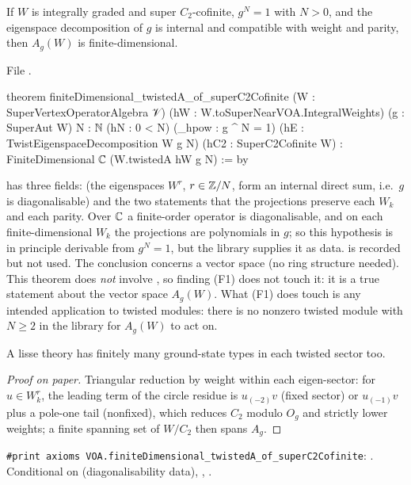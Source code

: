 \begin{theorem}\label{l17:thm:twistedzhufinite}
If $W$ is integrally graded and super $C_2$-cofinite, $g^N=1$ with $N>0$, and the eigenspace
decomposition of $g$ is internal and compatible with weight and parity, then $A_g(W)$ is
finite-dimensional.
\end{theorem}
\noindent File .
\begin{leancode}
theorem finiteDimensional_twistedA_of_superC2Cofinite
    (W : SuperVertexOperatorAlgebra 𝒱) (hW : W.toSuperNearVOA.IntegralWeights)
    (g : SuperAut W) {N : ℕ} (hN : 0 < N) (_hpow : g ^ N = 1)
    (hE : TwistEigenspaceDecomposition W g N) (hC2 : SuperC2Cofinite W) :
    FiniteDimensional ℂ (W.twistedA hW g N) := by
\end{leancode}
\begin{dictionary}
 has three fields:  (the eigenspaces
$W^r$, $r\in{\mathbb{Z}}/N$, form an internal direct sum, i.e.\ $g$ is diagonalisable) and the two statements that
the projections preserve each $W_k$ and each parity. Over ${\mathbb{C}}$ a finite-order operator is
diagonalisable, and on each finite-dimensional $W_k$ the projections are polynomials in $g$; so this
hypothesis is in principle derivable from $g^N=1$, but the library supplies it as data. 
is recorded but not used. The conclusion concerns a vector space (no ring structure needed). This
theorem does \emph{not} involve , so finding (F1) does not touch it: it is a
true statement about the vector space $A_g(W)$. What (F1) does touch is any intended application to
twisted modules: there is no nonzero twisted module with $N\ge2$ in the library for $A_g(W)$ to act on.
\end{dictionary}
\begin{physics}
A lisse theory has finitely many ground-state types in each twisted sector too.
\end{physics}
\begin{proof}[Proof on paper]
Triangular reduction by weight within each eigen-sector: for $u\in W^r_k$, the leading term of the
circle residue is $u_{(-2)}v$ (fixed sector) or $u_{(-1)}v$ plus a pole-one tail (nonfixed), which
reduces $C_2$ modulo $O_g$ and strictly lower weights; a finite spanning set of $W/C_2$ then spans
$A_g$.
\end{proof}
\begin{status}
\texttt{\#print axioms VOA.finiteDimensional\_twistedA\_of\_superC2Cofinite}: . Conditional on  (diagonalisability data), ,
.
\end{status}

